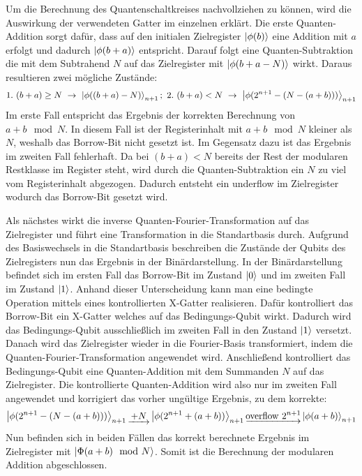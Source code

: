 Um die Berechnung des Quantenschaltkreises nachvollziehen zu können, 
wird die Auswirkung der verwendeten Gatter im einzelnen erklärt.
Die erste Quanten-Addition sorgt dafür, 
dass auf den initialen Zielregister \(\ket{\phi(b)}\) eine Addition mit \(a\) erfolgt und 
dadurch \(\ket{\phi(b + a)}\) entspricht.
Darauf folgt eine Quanten-Subtraktion die mit dem Subtrahend \(N\) auf das Zielregister mit
\(\ket{\phi(b + a - N)}\) wirkt. 
Daraus resultieren zwei mögliche Zustände:
\[1.~(b+a) \geq N~\rightarrow~\ket{\phi((b+a) - N)}_{n+1};~2.~
(b+a) < N~\rightarrow~\ket{\phi(2^{n+1}-(N-(a+b)))}_{n+1}
  \]
Im erste Fall entspricht das Ergebnis der korrekten Berechnung von \(a+b \mod N\).
In diesem Fall ist der Registerinhalt mit \(a+b \mod N\) kleiner als \(N\), 
weshalb das Borrow-Bit nicht gesetzt ist.
Im Gegensatz dazu ist das Ergebnis im zweiten Fall fehlerhaft.
Da bei \((b+a) < N\) bereits der Rest der modularen Restklasse im Register steht, 
wird durch die Quanten-Subtraktion ein \(N\) zu viel vom Registerinhalt abgezogen.
Dadurch entsteht ein underflow im Zielregister wodurch das Borrow-Bit gesetzt wird.

Als nächstes wirkt die inverse Quanten-Fourier-Transformation auf das Zielregister und führt eine Transformation in die Standartbasis durch.
Aufgrund des Basiswechsels in die Standartbasis beschreiben die Zustände der Qubits des Zielregisters nun das Ergebnis in der Binärdarstellung.
In der Binärdarstellung befindet sich im ersten Fall das Borrow-Bit im Zustand \(\ket{0}\) und im zweiten Fall im Zustand \(\ket{1}\).
Anhand dieser Unterscheidung kann man eine bedingte Operation mittels eines kontrollierten X-Gatter realisieren.
Dafür kontrolliert das Borrow-Bit ein X-Gatter welches auf das Bedingungs-Qubit wirkt.
Dadurch wird das Bedingungs-Qubit ausschließlich im zweiten Fall in den Zustand \(\ket{1}\) versetzt.
Danach wird das Zielregister wieder in die Fourier-Basis transformiert, 
indem die Quanten-Fourier-Transformation angewendet wird.
Anschließend kontrolliert das Bedingungs-Qubit eine Quanten-Addition mit dem Summanden \(N\) auf das Zielregister.
Die kontrollierte Quanten-Addition wird also nur im zweiten Fall angewendet und korrigiert das vorher ungültige Ergebnis,
zu dem korrekte:
\[
\ket{\phi(2^{n+1}-(N-(a+b)))}_{n+1} \underrightarrow{~+N~} 
\ket{\phi(2^{n+1}+(a+b))}_{n+1} \underrightarrow{\text{overflow }2^{n+1}}
\ket{\phi(a+b)}_{n+1}
  \]
Nun befinden sich in beiden Fällen das korrekt berechnete Ergebnis im Zielregister mit \(\ket{\Phi(a+b)\mod N}\).
Somit ist die Berechnung der modularen Addition abgeschlossen.

